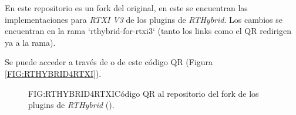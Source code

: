 
En este repositorio es un fork del original, en este se encuentran las implementaciones para \textit{RTXI V3} de los plugins de \textit{RTHybrid}. Los cambios se encuentran en la rama `rthybrid-for-rtxi3` (tanto los links como el QR redirigen ya a la rama).

Se puede acceder a través de  o de este código QR (Figura \ref{FIG:RTHYBRID4RTXI}).

\begin{figure}[QR repositorio de los plugins de RTHybrid para RTXI V3]{FIG:RTHYBRID4RTXI}{Código QR al repositorio del fork de los plugins de \textit{RTHybrid} ().
}
\end{figure}
